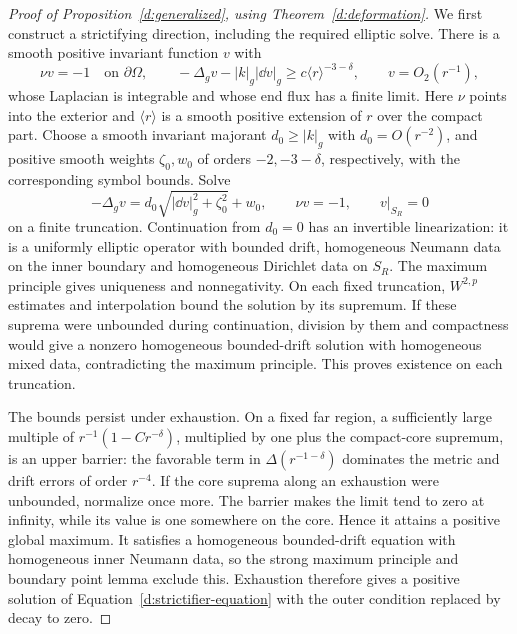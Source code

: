 \begin{proof}[Proof of Proposition~\ref{d:generalized}, using Theorem~\ref{d:deformation}]
We first construct a strictifying direction, including the required
elliptic solve.  There is a smooth positive invariant function $v$ with
\begin{equation}\label{d:strictifier}
 \nu v=-1\quad\text{on }\partial\Omega,\qquad
 -\Delta_gv-|k|_g|\dd v|_g\ge c\langle r\rangle^{-3-\delta},\qquad
 v=O_2(r^{-1}),
\end{equation}
whose Laplacian is integrable and whose end flux has a finite limit.
Here $\nu$ points into the exterior and $\langle r\rangle$ is a smooth
positive extension of $r$ over the compact part.  Choose a smooth
invariant majorant $d_0\ge|k|_g$ with $d_0=O(r^{-2})$, and positive
smooth weights $\zeta_0,w_0$ of orders $-2,-3-\delta$, respectively,
with the corresponding symbol bounds.  Solve
\begin{equation}\label{d:strictifier-equation}
 -\Delta_gv=d_0\sqrt{|\dd v|_g^2+\zeta_0^2}+w_0,\qquad
 \nu v=-1,\qquad v|_{S_R}=0
\end{equation}
on a finite truncation.  Continuation from $d_0=0$ has an invertible
linearization: it is a uniformly elliptic operator with bounded drift,
homogeneous Neumann data on the inner boundary and homogeneous
Dirichlet data on $S_R$.  The maximum principle gives uniqueness and
nonnegativity.  On each fixed truncation, $W^{2,p}$ estimates and
interpolation bound the solution by its supremum.  If these suprema
were unbounded during continuation, division by them and compactness
would give a nonzero homogeneous bounded-drift solution with
homogeneous mixed data, contradicting the maximum principle.  This
proves existence on each truncation.

The bounds persist under exhaustion.  On a fixed far region, a
sufficiently large multiple of
$r^{-1}(1-Cr^{-\delta})$, multiplied by one plus the compact-core
supremum, is an upper barrier: the favorable term in
$\Delta(r^{-1-\delta})$ dominates the metric and drift errors of order
$r^{-4}$.  If the core suprema along an exhaustion were unbounded,
normalize once more.  The barrier makes the limit tend to zero at
infinity, while its value is one somewhere on the core.  Hence it
attains a positive global maximum.  It satisfies a homogeneous
bounded-drift equation with homogeneous inner Neumann data, so the
strong maximum principle and
boundary point lemma exclude this.  Exhaustion therefore gives a
positive solution of Equation~\eqref{d:strictifier-equation} with the
outer condition replaced by decay to zero.


\end{proof}
